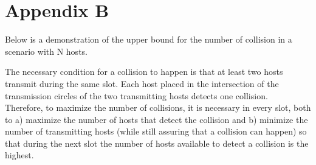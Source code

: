 \section*{Appendix B}
\label{app:c}
Below is a demonstration of the upper bound for the number of collision in a scenario with N hosts.

\hfill \break
The necessary condition for a collision to happen is that at least two hosts transmit during the same slot. Each host placed in the intersection of the transmission circles of the two transmitting hosts detects one collision. \\
Therefore, to maximize the number of collisions, it is necessary in every slot, both to a) maximize the number of hosts that detect the collision and b) minimize the number of transmitting hosts (while still assuring that a collision can happen) so that during the next slot the number of hosts available to detect a collision is the highest.

